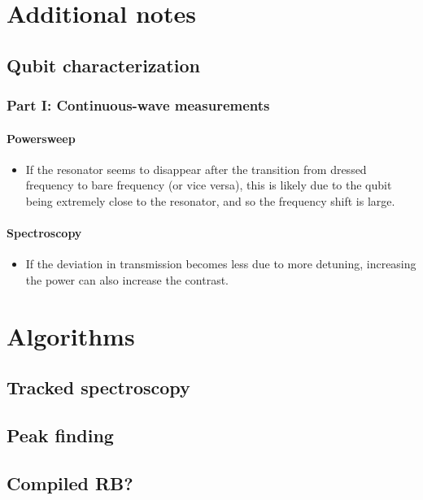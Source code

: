 \documentclass[12pt]{report}
\begin{document}
\begin{appendices}

  \chapter{Additional notes}
    \section{Qubit characterization}
      \subsection{Part I: Continuous-wave measurements}
        \subsubsection{Powersweep}
          \begin{itemize}
            \item If the resonator seems to disappear after the transition from dressed frequency to bare frequency (or vice versa), this is likely due to the qubit being extremely close to the resonator, and so the frequency shift is large.
          \end{itemize}
        \subsubsection{Spectroscopy}
          \begin{itemize}
            \item If the deviation in transmission becomes less due to more detuning, increasing the power can also increase the contrast.
          \end{itemize}
  \chapter{Algorithms}
    \section{Tracked spectroscopy}
    \section{Peak finding}
    \section{Compiled RB?}

\end{appendices}
\end{document}
